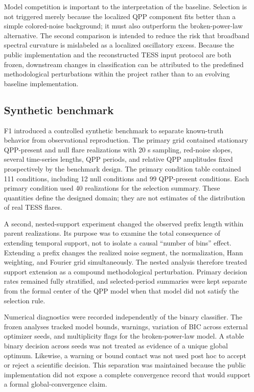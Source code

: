 \documentclass[11pt,a4paper]{article}
\begin{document}
Model competition is important to the interpretation of the baseline. Selection is not triggered merely because the localized QPP component fits better than a simple colored-noise background; it must also outperform the broken-power-law alternative. The second comparison is intended to reduce the risk that broadband spectral curvature is mislabeled as a localized oscillatory excess. Because the public implementation and the reconstructed TESS input protocol are both frozen, downstream changes in classification can be attributed to the predefined methodological perturbations within the project rather than to an evolving baseline implementation.

\subsection{Synthetic benchmark}
F1 introduced a controlled synthetic benchmark to separate known-truth behavior from observational reproduction. The primary grid contained stationary QPP-present and null flare realizations with 20 s sampling, red-noise slopes, several time-series lengths, QPP periods, and relative QPP amplitudes fixed prospectively by the benchmark design. The primary condition table contained 111 conditions, including 12 null conditions and 99 QPP-present conditions. Each primary condition used 40 realizations for the selection summary. These quantities define the designed domain; they are not estimates of the distribution of real TESS flares.

A second, nested-support experiment changed the observed prefix length within parent realizations. Its purpose was to examine the total consequence of extending temporal support, not to isolate a causal ``number of bins'' effect. Extending a prefix changes the realized noise segment, the normalization, Hann weighting, and Fourier grid simultaneously. The nested analysis therefore treated support extension as a compound methodological perturbation. Primary decision rates remained fully stratified, and selected-period summaries were kept separate from the formal center of the QPP model when that model did not satisfy the selection rule.

Numerical diagnostics were recorded independently of the binary classifier. The frozen analyses tracked model bounds, warnings, variation of BIC across external optimizer seeds, and multiplicity flags for the broken-power-law model. A stable binary decision across seeds was not treated as evidence of a unique global optimum. Likewise, a warning or bound contact was not used post hoc to accept or reject a scientific decision. This separation was maintained because the public implementation did not expose a complete convergence record that would support a formal global-convergence claim.
\end{document}
